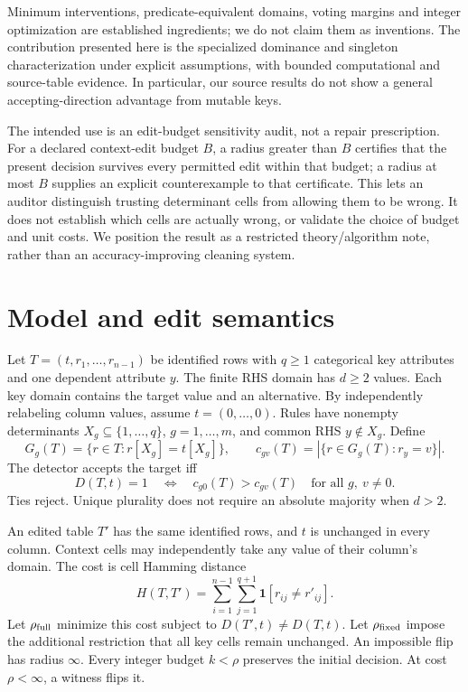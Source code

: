 \documentclass[11pt]{article}
\newcommand{\ind}{\mathbf{1}}
\newcommand{\INF}{\infty}
\begin{document}
Minimum interventions, predicate-equivalent domains, voting margins and integer
optimization are established ingredients; we do not claim them as inventions.
The contribution presented here is the specialized dominance and singleton
characterization under explicit assumptions, with bounded computational and
source-table evidence. In particular, our source results do not show a general
accepting-direction advantage from mutable keys.


The intended use is an edit-budget sensitivity audit, not a repair prescription.
For a declared context-edit budget $B$, a radius greater than $B$ certifies that
the present decision survives every permitted edit within that budget; a radius
at most $B$ supplies an explicit counterexample to that certificate. This lets
an auditor distinguish trusting determinant cells from allowing them to be
wrong. It does not establish which cells are actually wrong, or validate the
choice of budget and unit costs. We position the result as a restricted
theory/algorithm note, rather than an accuracy-improving cleaning system.

\section{Model and edit semantics}
Let $T=(t,r_1,\ldots,r_{n-1})$ be identified rows with $q\geq1$ categorical key
attributes and one dependent attribute $y$. The finite RHS domain has
$d\geq2$ values. Each key domain contains the target value and an alternative.
By independently relabeling column values, assume $t=(0,\ldots,0)$.
Rules have nonempty determinants $X_g\subseteq\{1,\ldots,q\}$, $g=1,\ldots,m$,
and common RHS $y\notin X_g$. Define
\[
 G_g(T)=\{r\in T:r[X_g]=t[X_g]\},\qquad
 c_{gv}(T)=|\{r\in G_g(T):r_y=v\}|.
\]
The detector accepts the target iff
\begin{equation}\label{eq:accept}
 D(T,t)=1\quad\Longleftrightarrow\quad
 c_{g0}(T)>c_{gv}(T)\quad\text{for all }g,\ v\ne0.
\end{equation}
Ties reject. Unique plurality does not require an absolute majority when $d>2$.

An edited table $T'$ has the same identified rows, and $t$ is unchanged in every
column. Context cells may independently take any value of their column's
domain. The cost is cell Hamming distance
\[
 H(T,T')=\sum_{i=1}^{n-1}\sum_{j=1}^{q+1}\ind[r_{ij}\ne r'_{ij}].
\]
Let $\rho_{\rm full}$ minimize this cost subject to $D(T',t)\ne D(T,t)$.
Let $\rho_{\rm fixed}$ impose the additional restriction that all key cells
remain unchanged. An impossible flip has radius $\INF$. Every integer budget
$k<\rho$ preserves the initial decision. At cost $\rho<\INF$, a witness flips it.
\end{document}
